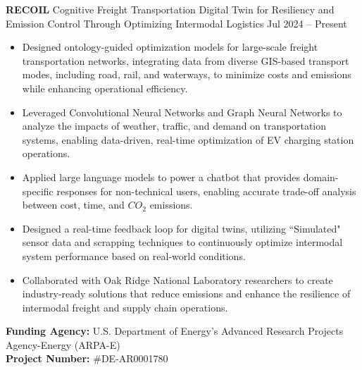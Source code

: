 \documentclass[10pt, letterpaper]{article}
\newenvironment{highlights}{
    \begin{itemize}[
        topsep=0.10 cm,
        parsep=0.10 cm,
        partopsep=0pt,
        itemsep=0pt,
        leftmargin=0 cm + 10pt
    ]
}{
    \end{itemize}
} %
\newenvironment{twocolentry}[2][]{
    \onecolentry
    \def\secondColumn{#2}
    \setcolumnwidth{\fill, 4.5 cm}
    \begin{paracol}{2}
}{
    \switchcolumn \raggedleft \secondColumn
    \end{paracol}
    \endonecolentry
} %
\begin{document}
        \begin{twocolentry}{Jul 2024 – Present} \textbf{RECOIL} \textbar Cognitive Freight Transportation Digital Twin for Resiliency and Emission Control Through Optimizing Intermodal Logistics \end{twocolentry} \begin{highlights} 
            \item Designed ontology-guided optimization models for large-scale freight transportation networks, integrating data from diverse GIS-based transport modes, including road, rail, and waterways, to minimize costs and emissions while enhancing operational efficiency. 
            \item Leveraged Convolutional Neural Networks and Graph Neural Networks to analyze the impacts of weather, traffic, and demand on transportation systems, enabling data-driven, real-time optimization of EV charging station operations. 
            \item Applied large language models to power a chatbot that provides domain-specific responses for non-technical users, enabling accurate trade-off analysis between cost, time, and $CO_2$ emissions.
            \item Designed a real-time feedback loop for digital twins, utilizing ``Simulated" sensor data and scrapping techniques to continuously optimize intermodal system performance based on real-world conditions.
            \item Collaborated with Oak Ridge National Laboratory researchers to create industry-ready solutions that reduce emissions and enhance the resilience of intermodal freight and supply chain operations.
            
            \end{highlights} \vspace{0.3cm} \noindent \textbf{Funding Agency:} U.S. Department of Energy’s Advanced Research Projects Agency-Energy (ARPA-E)\\  \textbf{Project Number:} \#DE-AR0001780
\end{document}
